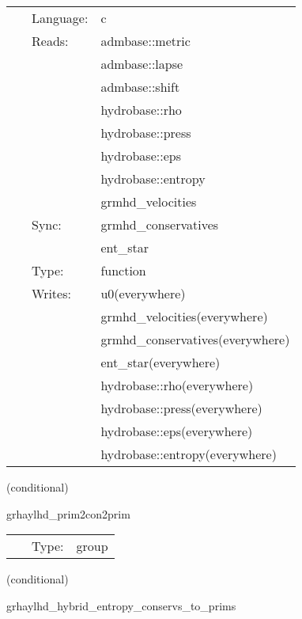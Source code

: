 \documentclass{article}
\begin{document}
 \begin{tabular*}{160mm}{cll} 
~ & Language:  & c \\ 
~ & Reads:  & admbase::metric \\ 
~& ~ &admbase::lapse\\ 
~& ~ &admbase::shift\\ 
~& ~ &hydrobase::rho\\ 
~& ~ &hydrobase::press\\ 
~& ~ &hydrobase::eps\\ 
~& ~ &hydrobase::entropy\\ 
~& ~ &grmhd\_velocities\\ 
~ & Sync:  & grmhd\_conservatives \\ 
~& ~ &ent\_star\\ 
~ & Type:  & function \\ 
~ & Writes:  & u0(everywhere) \\ 
~& ~ &grmhd\_velocities(everywhere)\\ 
~& ~ &grmhd\_conservatives(everywhere)\\ 
~& ~ &ent\_star(everywhere)\\ 
~& ~ &hydrobase::rho(everywhere)\\ 
~& ~ &hydrobase::press(everywhere)\\ 
~& ~ &hydrobase::eps(everywhere)\\ 
~& ~ &hydrobase::entropy(everywhere)\\ 
\end{tabular*} 


\vspace{5mm}

   (conditional) 

\hspace{5mm} grhaylhd\_prim2con2prim 

\hspace{5mm}{\it convert hydrobase initial data to grhaylhd variables } 


\hspace{5mm}

 \begin{tabular*}{160mm}{cll} 
~ & Type:  & group \\ 
\end{tabular*} 


\vspace{5mm}

   (conditional) 

\hspace{5mm} grhaylhd\_hybrid\_entropy\_conservs\_to\_prims 
\end{document}
